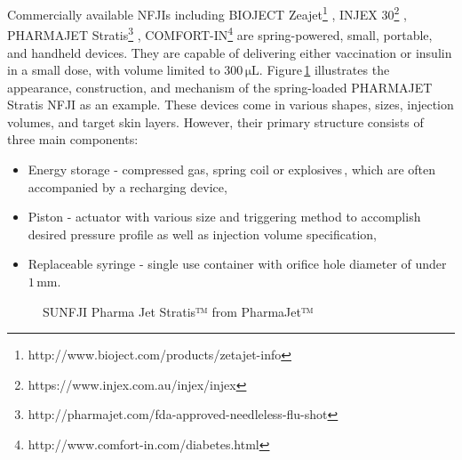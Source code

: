         Commercially available \acsp{NFJI} including BIOJECT Zeajet\footnote{http://www.bioject.com/products/zetajet-info} , INJEX 30\footnote{https://www.injex.com.au/injex/injex} , PHARMAJET Stratis\footnote{http://pharmajet.com/fda-approved-needleless-flu-shot} , COMFORT-IN\footnote{http://www.comfort-in.com/diabetes.html}  are spring-powered, small, portable, and handheld devices. They are capable of delivering either vaccination or insulin in a small dose, with volume limited to $\mathrm{300\,\mu L}$. Figure\,\ref{fig:chapter/background/pharma jet stratis} illustrates the appearance, construction, and mechanism of the spring-loaded PHARMAJET Stratis NFJI as an example. These devices come in various shapes, sizes, injection volumes, and target skin layers. However, their primary structure consists of three main components:
        \begin{itemize}
            \item Energy storage - compressed gas, spring coil or explosives\,\cite{taberner2012}, which are often accompanied by a recharging device,
            \item Piston - actuator with various size and triggering method to accomplish desired pressure profile as well as injection volume specification,
            \item Replaceable syringe - single use container with orifice hole diameter of under $\mathrm{1\,mm}$.
        \end{itemize}
        
        \begin{figure}[!ht]
            \centering
            \qquad
            \caption{
                SUNFJI Pharma Jet Stratis™ from PharmaJet™
            }   \label{fig:chapter/background/pharma jet stratis}
        \end{figure}
        
